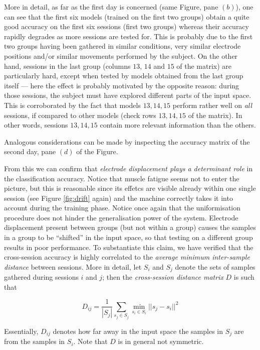More in detail, as far as the first day is concerned (same Figure,
pane $(b)$), one can see that the first six models (trained on the
first two groups) obtain a quite good accuracy on the first six
sessions (first two groups) whereas their accuracy rapidly degrades as
more sessions are tested for. This is probably due to the first two
groups having been gathered in similar conditions, very similar
electrode positions and/or similar movements performed by the
subject. On the other hand, sessions in the last group (columns $13$,
$14$ and $15$ of the matrix) are particularly hard, except when tested
by models obtained from the last group itself --- here the effect is
probably motivated by the opposite reason: during those sessions, the
subject must have explored different parts of the input space. This is
corroborated by the fact that models $13,14,15$ perform rather well on
\emph{all} sessions, if compared to other models (check rows
$13,14,15$ of the matrix). In other words, sessions $13,14,15$ contain
more relevant information than the others.

Analogous considerations can be made by inspecting the accuracy matrix
of the second day, pane $(d)$ of the Figure.

From this we can confirm that \emph{electrode displacement plays a
determinant role} in the classification accuracy. Notice that muscle
fatigue seems not to enter the picture, but this is reasonable since
its effetcs are visible already within one single session (see Figure
\ref{fig:drift} again) and the machine correctly takes it into account
during the training phase. Notice once again that the uniformisation
procedure does not hinder the generalisation power of the
system. Electrode displacement present between groups (but not within
a group) causes the samples in a group to be ``shifted'' in the input
space, so that testing on a different group results in poor
performance. To substantiate this claim, we have verified that the
cross-session accuracy is highly correlated to the \emph{average
minimum inter-sample distance} between sessions. More in detail, let
$S_i$ and $S_j$ denote the sets of samples gathered during sessions
$i$ and $j$; then the \emph{cross-session distance matrix} $D$ is such
that

$$ D_{ij} = \frac{1}{|S_j|} \sum_{s_j \in S_j}{\min_{s_i \in S_i}{ ||s_j-s_i||^2 } } $$

Essentially, $D_{ij}$ denotes how far away in the input space the
samples in $S_j$ are from the samples in $S_i$. Note that $D$ is in
general not symmetric.

